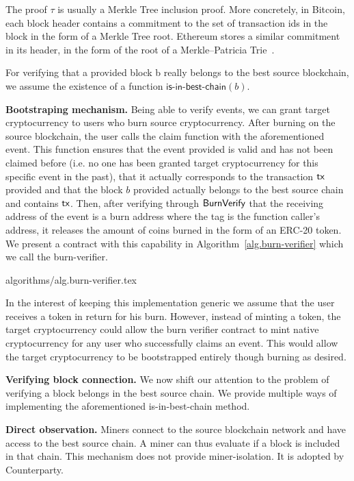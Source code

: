 The proof $\tau$ is usually a Merkle Tree inclusion proof. More concretely, in Bitcoin, each block header contains a commitment to the set of transaction ids in the block in the form of a Merkle Tree root. Ethereum stores a similar commitment in its header, in the form of the root of a Merkle--Patricia Trie~\cite{wood2014ethereum}.

For verifying that a provided block \textsf{b} really belongs to the best source blockchain, we assume the existence of a function $\textsf{is-in-best-chain}(b)$.

\noindent
\textbf{Bootstraping mechanism.}
Being able to verify events, we can grant target cryptocurrency to users who burn source cryptocurrency. After burning on the source blockchain, the user calls the \textsf{claim} function with the aforementioned event. This function ensures that the event provided is valid and has not been claimed before (i.e. no one has been granted target cryptocurrency for this specific event in the past), that it actually corresponds to the transaction $\textsf{tx}$ provided and that the block $b$ provided actually belongs to the best source chain and contains $\textsf{tx}$. Then, after verifying through $\mathsf{BurnVerify}$ that the receiving address of the event is a burn address where the tag is the function caller's address, it releases the amount of coins burned in the form of an ERC-20 token. We present a contract with this capability in Algorithm~\ref{alg.burn-verifier} which we call the \textsf{burn-verifier}.

{algorithms/alg.burn-verifier.tex}

In the interest of keeping this implementation generic we assume that the user receives a token in return for his burn. However, instead of minting a token, the target cryptocurrency could allow the burn verifier contract to mint native cryptocurrency for any user who successfully claims an event. This would allow the target cryptocurrency to be bootstrapped entirely though burning as desired.

\noindent
\textbf{Verifying block connection.}
We now shift our attention to the problem of verifying a block belongs in the best source chain. We provide multiple ways of implementing the aforementioned \textsf{is-in-best-chain} method.

\noindent
\textbf{Direct observation.}
Miners connect to the source blockchain network and have access to the best source chain. A miner can thus evaluate if a block is included in that chain. This mechanism does not provide miner-isolation. It is adopted by Counterparty.

